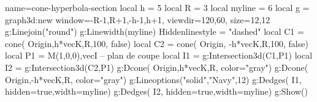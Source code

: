 \documentclass[varwidth, border = 3pt]{standalone}
\begin{document}
\begin{luadraw}{name=cone-hyperbola-section}
    local h = 5
    local R = 3
    local myline = 6
    local g = graph3d:new{
        window={-R-1,R+1,-h-1,h+1},
        viewdir={120,60},
        size={12,12}}
    g:Linejoin("round")
    g:Linewidth(myline)
    Hiddenlinestyle = "dashed"
    local C1 = cone(
        Origin,h*vecK,R,100,
        false)
    local C2 = cone(
        Origin, -h*vecK,R,100,
        false)
    local P1 = {M(1,0,0),vecI} -- plan de coupe
    local I1 = g:Intersection3d(C1,P1)
    local I2 = g:Intersection3d(C2,P1)
    g:Dcone(
        Origin,h*vecK,R,
        {color="gray"})
    g:Dcone(
        Origin,-h*vecK,R,
        {color="gray"})
    g:Lineoptions("solid","Navy",12)
    g:Dedges(
        I1,
        {hidden=true,width=myline})
    g:Dedges(
        I2,
        {hidden=true,width=myline})
    g:Show()
\end{luadraw}
\end{document}
